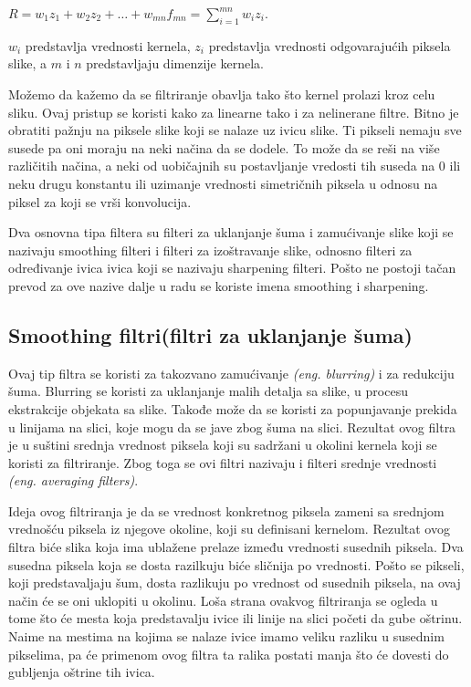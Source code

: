 \documentclass[a4paper,12pt,titlepage]{article}
\begin{document}
\begin{center}
$R = w_{1}z_{1} + w_{2}z_{2} + \dots + w_{mn}f_{mn} = \sum_{i = 1}^{mn} w_{i}z_{i}$.\\
\end{center}

$w_{i}$ predstavlja vrednosti kernela, $z_{i}$ predstavlja vrednosti odgovarajućih piksela slike, a $m$ i $n$ predstavljaju dimenzije kernela.

Možemo da kažemo da se filtriranje obavlja tako što kernel prolazi kroz celu sliku. Ovaj pristup se koristi kako za linearne tako i za nelinerane filtre. Bitno je obratiti pažnju na piksele slike koji se nalaze uz ivicu slike. Ti pikseli nemaju sve susede pa oni moraju na neki načina da se dodele. To može da se reši na više različitih načina, a neki od uobičajnih su postavljanje vredosti tih suseda na 0 ili neku drugu konstantu ili uzimanje vrednosti simetričnih piksela u odnosu na piksel za koji se vrši konvolucija. 

Dva osnovna tipa filtera su filteri za uklanjanje šuma i zamućivanje slike koji se nazivaju smoothing filteri i filteri za izoštravanje slike, odnosno filteri za određivanje ivica ivica koji se nazivaju sharpening filteri. Pošto ne postoji tačan prevod za ove nazive dalje u radu se koriste imena smoothing i sharpening.

\subsection{Smoothing filtri(filtri za uklanjanje šuma)}%

Ovaj tip filtra se koristi za takozvano zamućivanje \emph{(eng. blurring)} i za redukciju šuma. Blurring se koristi za uklanjanje malih detalja sa slike, u procesu ekstrakcije objekata sa slike. Takođe može da se koristi za popunjavanje prekida u linijama na slici, koje mogu da se jave zbog šuma na slici. Rezultat ovog filtra je u suštini srednja vrednost piksela koji su sadržani u okolini kernela koji se koristi za filtriranje. Zbog toga se ovi filtri nazivaju i filteri srednje vrednosti \emph{(eng. averaging filters)}. 

Ideja ovog filtriranja je da se vrednost konkretnog piksela zameni sa srednjom vrednošću piksela iz njegove okoline, koji su definisani kernelom. Rezultat ovog filtra biće slika koja ima ublažene prelaze između vrednosti susednih piksela. Dva susedna piksela koja se dosta razilkuju biće sličnija po vrednosti. Pošto se pikseli, koji predstavaljaju šum, dosta razlikuju po vrednost od susednih piksela, na ovaj način će se oni uklopiti u okolinu. Loša strana ovakvog filtriranja se ogleda u tome što će mesta koja predstavalju ivice ili linije na slici početi da gube oštrinu. Naime na mestima na kojima se nalaze ivice imamo veliku razliku u susednim pikselima, pa će primenom ovog filtra ta ralika postati manja što će dovesti do gubljenja oštrine tih ivica.  
\end{document}
